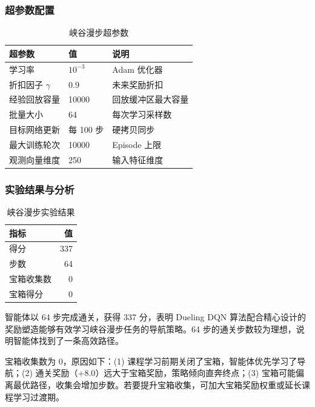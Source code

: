 \documentclass[12pt,a4paper]{article}
\begin{document}
\subsubsection{超参数配置}

\begin{table}[htbp]
\centering
\caption{峡谷漫步超参数}\label{tab:hw1_hyper}
\begin{tabular}{llp{6cm}}
\toprule
\textbf{超参数} & \textbf{值} & \textbf{说明} \\
\midrule
学习率           & $10^{-3}$   & Adam 优化器 \\
折扣因子 $\gamma$  & 0.9       & 未来奖励折扣 \\
经验回放容量      & 10000     & 回放缓冲区最大容量 \\
批量大小          & 64        & 每次学习采样数 \\
目标网络更新      & 每 100 步  & 硬拷贝同步 \\
最大训练轮次      & 10000     & Episode 上限 \\
观测向量维度      & 250       & 输入特征维度 \\
\bottomrule
\end{tabular}
\end{table}

\subsubsection{实验结果与分析}

\begin{table}[htbp]
\centering
\caption{峡谷漫步实验结果}\label{tab:hw1_result}
\begin{tabular}{lr}
\toprule
\textbf{指标} & \textbf{值} \\
\midrule
得分         & 337 \\
步数         & 64 \\
宝箱收集数   & 0 \\
宝箱得分     & 0 \\
\bottomrule
\end{tabular}
\end{table}

智能体以 64 步完成通关，获得 337 分，表明 Dueling DQN 算法配合精心设计的奖励塑造能够有效学习峡谷漫步任务的导航策略。64 步的通关步数较为理想，说明智能体找到了一条高效路径。

宝箱收集数为 0，原因如下：(1) 课程学习前期关闭了宝箱，智能体优先学习了导航；(2) 通关奖励（$+8.0$）远大于宝箱奖励，策略倾向直奔终点；(3) 宝箱可能偏离最优路径，收集会增加步数。若要提升宝箱收集，可加大宝箱奖励权重或延长课程学习过渡期。
\end{document}
